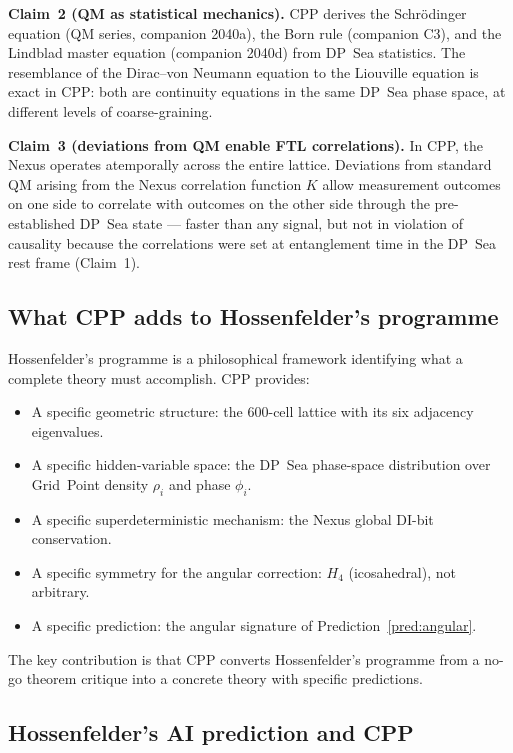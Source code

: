 \documentclass[11pt,a4paper]{article}
\begin{document}
\textbf{Claim~2 (QM as statistical mechanics).}
CPP derives the Schrödinger equation (QM series, companion 2040a),
the Born rule (companion C3), and the Lindblad master equation
(companion 2040d) from DP~Sea statistics.  The resemblance of
the Dirac--von Neumann equation to the Liouville equation is
exact in CPP: both are continuity equations in the same DP~Sea
phase space, at different levels of coarse-graining.

\textbf{Claim~3 (deviations from QM enable FTL correlations).}
In CPP, the Nexus operates atemporally across the entire lattice.
Deviations from standard QM arising from the Nexus correlation
function $K$ allow measurement outcomes on one side to correlate
with outcomes on the other side through the pre-established
DP~Sea state --- faster than any signal, but not in violation of
causality because the correlations were set at entanglement time
in the DP~Sea rest frame (Claim~1).

\subsection{What CPP adds to Hossenfelder's programme}

Hossenfelder's programme is a philosophical framework identifying
what a complete theory must accomplish.  CPP provides:
\begin{itemize}
\item A specific geometric structure: the 600-cell lattice with its
  six adjacency eigenvalues.
\item A specific hidden-variable space: the DP~Sea phase-space
  distribution over Grid~Point density $\rho_i$ and phase $\phi_i$.
\item A specific superdeterministic mechanism: the Nexus global
  DI-bit conservation.
\item A specific symmetry for the angular correction: $H_4$
  (icosahedral), not arbitrary.
\item A specific prediction: the angular signature of
  Prediction~\ref{pred:angular}.
\end{itemize}

The key contribution is that CPP converts Hossenfelder's programme
from a no-go theorem critique into a concrete theory with specific
predictions.

\subsection{Hossenfelder's AI prediction and CPP}
\end{document}
